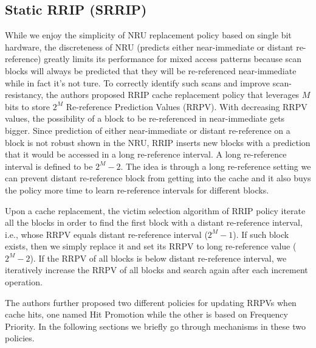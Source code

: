 \documentclass[conference]{IEEEtran}
\begin{document}
\subsection{Static RRIP (SRRIP)}
While we enjoy the simplicity of NRU replacement policy based on single bit hardware, the discreteness of NRU (predicts either near-immediate or distant re-reference) greatly limits its performance for mixed access patterns because scan blocks will always be predicted that they will be re-referenced near-immediate while in fact it's not ture. To correctly identify such scans and improve scan-resistancy, the authors proposed RRIP cache replacement policy that leverages $M$ bits to store $2^M$ Re-reference Prediction Values (RRPV). With decreasing RRPV values, the possibility of a block to be re-referenced in near-immediate gets bigger. Since prediction of either near-immediate or distant re-reference on a block is not robust shown in the NRU, RRIP inserts new blocks with a prediction that it would be accessed in a long re-reference interval. A long re-reference interval is defined to be $2^M - 2$. The idea is through a long re-reference setting we can prevent distant re-reference block from getting into the cache and it also buys the policy more time to learn re-reference intervals for different blocks.

Upon a cache replacement, the victim selection algorithm of RRIP policy iterate all the blocks in order to find the first block with a distant re-reference interval, i.e., whose RRPV equals distant re-reference interval ($2^M - 1$). If such block exists, then we simply replace it and set its RRPV to long re-reference value ($2^M - 2$). If the RRPV of all blocks is below distant re-reference interval, we iteratively increase the RRPV of all blocks and search again after each increment operation. 

The authors further proposed two different policies for updating RRPVs when cache hits, one named Hit Promotion while the other is based on Frequency Priority. In the following sections we briefly go through mechanisms in these two policies.
\end{document}

